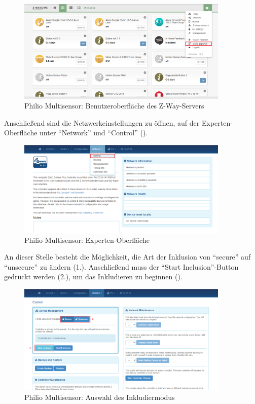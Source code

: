 \begin{figure}[h!]
	\centering
	\includegraphics[width=0.9\textwidth]{img/Sensorevaluation/PhilioConf2.png}
	\caption{Philio Multisensor: Benutzeroberfläche des Z-Way-Servers}
	\label{fig:sensorenPhilioConf2}
\end{figure}

Anschließend sind die Netzwerkeinstellungen zu öffnen, auf der Experten-Oberfläche  unter "`Network"' und "`Control"' ().

\begin{figure}[h!]
	\centering
	\includegraphics[width=0.9\textwidth]{img/Sensorevaluation/PhilioConf3.png}
	\caption{Philio Multisensor: Experten-Oberfläche}
	\label{fig:sensorenPhilioConf3}
\end{figure}

An dieser Stelle besteht die Möglichkeit, die Art der Inklusion von "`secure"' auf "`unsecure"' zu ändern (1.). Anschließend muss der "`Start Inclusion"'-Button gedrückt werden (2.), um das Inkludieren zu beginnen (). 

\begin{figure}[h!]
	\centering
	\includegraphics[width=0.9\textwidth]{img/Sensorevaluation/PhilioConf4.png}
	\caption{Philio Multisensor: Auswahl des Inkludiermodus}
	\label{fig:sensorenPhilioConf4}
\end{figure}

